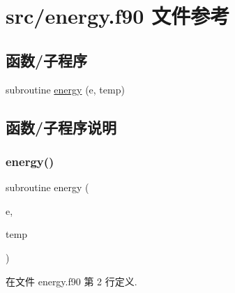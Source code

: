 \hypertarget{energy_8f90}{}\section{src/energy.f90 文件参考}
\label{energy_8f90}
\subsection*{函数/子程序}
\begin{DoxyCompactItemize}
\item 
subroutine \mbox{\hyperlink{energy_8f90_aa09f690b751989fd1445ea720333253a}{energy}} (e, temp)
\end{DoxyCompactItemize}


\subsection{函数/子程序说明}
\mbox{\label{energy_8f90_aa09f690b751989fd1445ea720333253a}} 
\subsubsection{\texorpdfstring{energy()}{energy()}}
{\footnotesize\ttfamily subroutine energy (\begin{DoxyParamCaption}\item[{}]{e,  }\item[{}]{temp }\end{DoxyParamCaption})}



在文件 energy.\+f90 第 2 行定义.

